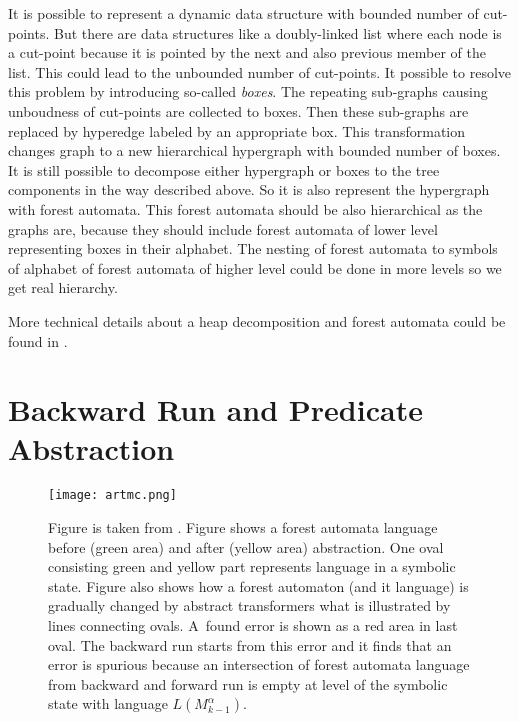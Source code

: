 \documentclass[fleqn,11pt]{ExcelAtFIT} %
\begin{document}
It is possible to represent a dynamic data structure with bounded number of cut-points.
But there are data structures like a doubly-linked list where each node is a cut-point because
it is pointed by the next and also previous member of the list.
This could lead to the unbounded number of cut-points.
It possible to resolve this problem by introducing so-called \emph{boxes}.
The repeating sub-graphs causing unboudness of cut-points are collected to boxes.
Then these sub-graphs are replaced by hyperedge labeled by an appropriate box.
This transformation changes graph to a new hierarchical hypergraph with bounded number of boxes.
It is still possible to decompose either hypergraph or boxes to the tree components in the way
described above.
So it is also represent the hypergraph with forest automata.
This forest automata should be also hierarchical as the graphs are, because they
should include forest automata of lower level representing boxes in their alphabet.
The nesting of forest automata to symbols of alphabet of forest automata of higher level
could be done in more levels so we get real hierarchy.

More technical details about a heap decomposition and forest automata could be found in \cite{forester11, forester13}.

\section{Backward Run and Predicate Abstraction}
\label{sec:br}

\begin{figure}[t]
	\centering
	\texttt{[image: artmc.png]}
	\caption{
		Figure is taken from \cite{artmc}.
		Figure shows a forest automata language before (green area)
		and after (yellow area) abstraction.
		One oval consisting green and yellow part represents language in a symbolic state.
		Figure also shows how a forest automaton (and it language) is gradually changed
		by abstract transformers what is illustrated by lines connecting ovals.
		A~found error is shown as a red area in last oval.
		The backward run starts from this error and it finds
		that an error is spurious because an intersection of forest automata language from backward
		and forward run is empty at level of the symbolic state with language $L(M^{\alpha}_{k-1})$.}
	\label{fig:bwrun}
\end{figure}
\end{document}
